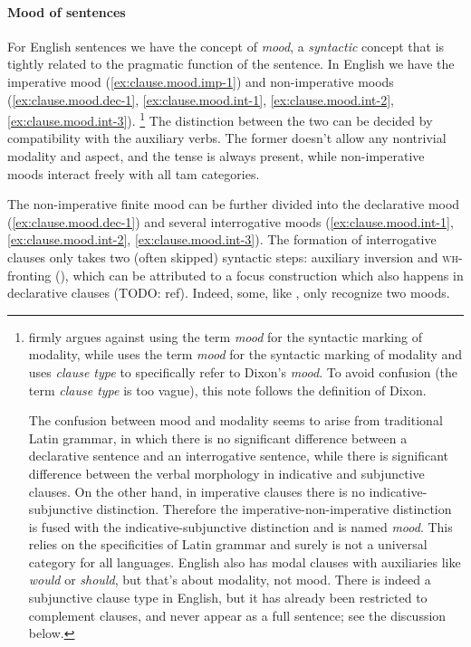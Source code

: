 \documentclass[UTF8, a4paper, oneside, scheme=plain, 12pt]{ctexbook}
\newcommand*{\citepage}[1]{p.~{#1}}
\newcommand*{\term}[1]{\emph{#1}}
\newcommand{\form}[1]{\emph{#1}}
\newcommand{\category}[1]{\textsc{#1}}
\begin{document}
\paragraph*{Mood of sentences} For English sentences we have the concept of \term{mood}, 
a \emph{syntactic} concept that is tightly related to the pragmatic function of the sentence.
In English we have the imperative mood (\ref{ex:clause.mood.imp-1})
and non-imperative moods (\ref{ex:clause.mood.dec-1}, 
\ref{ex:clause.mood.int-1}, 
\ref{ex:clause.mood.int-2},
\ref{ex:clause.mood.int-3}).%
\footnote{
    \citet{dixon2009basic1} firmly argues against using the term \term{mood} 
    for the syntactic marking of modality,
    while \citet{cgel} uses the term \term{mood} for the syntactic marking of modality
    and uses \term{clause type} to specifically refer to Dixon's \term{mood}.
    To avoid confusion (the term \term{clause type} is too vague),
    this note follows the definition of Dixon.

    The confusion between mood and modality seems to arise from traditional Latin grammar,
    in which there is no significant difference 
    between a declarative sentence and an interrogative sentence, 
    while there is significant difference
    between the verbal morphology in indicative and subjunctive clauses.
    On the other hand, in imperative clauses 
    there is no indicative-subjunctive distinction.
    Therefore the imperative-non-imperative distinction is fused with 
    the indicative-subjunctive distinction 
    and is named \term{mood}.
    This relies on the specificities of Latin grammar 
    and surely is not a universal category for all languages.
    English also has modal clauses with auxiliaries like \form{would} or \form{should},
    but that's about modality, not mood.
    There is indeed a subjunctive clause type in English,
    but it has already been restricted to complement clauses,
    and never appear as a full sentence; see the discussion below. 
}
The distinction between the two can be decided by compatibility with the auxiliary verbs.
The former doesn't allow any nontrivial modality and aspect,
and the tense is always present,
while non-imperative moods interact freely with all \acs{tam} categories.

The non-imperative finite mood
can be further divided into the declarative mood (\ref{ex:clause.mood.dec-1})
and several interrogative moods (\ref{ex:clause.mood.int-1}, 
\ref{ex:clause.mood.int-2},
\ref{ex:clause.mood.int-3}).
The formation of interrogative clauses 
only takes two (often skipped) syntactic steps: 
auxiliary inversion and \category{wh}-fronting
(),
which can be attributed to a focus construction which also happens in declarative clauses (TODO: ref).
Indeed, some, like \citet[\citepage{25}]{dixon2005semantic}, only recognize two moods.
\end{document}
